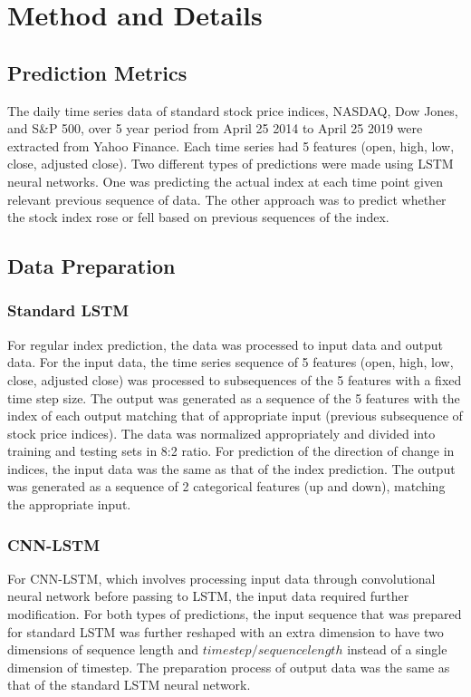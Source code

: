 \documentclass[12pt]{article}
\begin{document}
\section{Method and Details}

\subsection{Prediction Metrics}
The daily time series data of standard stock price indices, NASDAQ, Dow Jones, and S\&P 500, over 5 year period from April 25 2014 to April 25 2019 were extracted from Yahoo Finance. Each time series had 5 features (open, high, low, close, adjusted close). Two different types of predictions were made using LSTM neural networks. One was predicting the actual index at each time point given relevant previous sequence of data. The other approach was to predict whether the stock index rose or fell based on previous sequences of the index.

\subsection{Data Preparation}
\subsubsection{Standard LSTM}
For regular index prediction, the data was processed to input data and output data. For the input data, the time series sequence of 5 features (open, high, low, close, adjusted close) was processed to subsequences of the 5 features with a fixed time step size. The output was generated as a sequence of the 5 features with the index of each output matching that of appropriate input (previous subsequence of stock price indices). The data was normalized appropriately and divided into training and testing sets in 8:2 ratio. For prediction of the direction of change in indices, the input data was the same as that of the index prediction. The output was generated as a sequence of 2 categorical features (up and down), matching the appropriate input.

\subsubsection{CNN-LSTM}
For CNN-LSTM, which involves processing input data through convolutional neural network before passing to LSTM, the input data required further modification. For both types of predictions, the input sequence that was prepared for standard LSTM was further reshaped with an extra dimension to have two dimensions of sequence length and $timestep/sequence length$ instead of a single dimension of timestep. The preparation process of output data was the same as that of the standard LSTM neural network.
\end{document}

